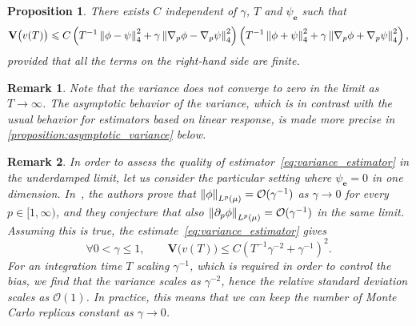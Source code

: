 \documentclass[11pt,a4paper]{article}
\newcommand{\var}[0]{\mathbf{V}}
\newcommand{\grad}{\nabla}
\newcommand{\vect}[1]{\boldsymbol{\mathbf #1}}
\theoremstyle{plain}
\newtheorem{proposition}{Proposition}[section]
\newtheorem{remark}{Remark}[section]
\numberwithin{equation}{section}
\renewcommand{\leq}{\leqslant}
\begin{document}
\begin{proposition}
    There exists $C$ independent of $\gamma$, $T$ and $\psi_{\vect e}$ such that
    \begin{equation}
        \label{eq:variance_estimator}
        \var \bigl(v(T)\bigr)
        \leq
        C \left( T^{-1} \norm{\phi - \psi}[4]^2  + \gamma \norm{\grad_p \phi - \grad_p \psi}[4]^2 \right)
        \left( T^{-1} \norm{\phi + \psi}[4]^2  + \gamma \norm{\grad_p \phi + \grad_p \psi}[4]^2 \right),
    \end{equation}
    provided that all the terms on the right-hand side are finite.
\end{proposition}
\begin{remark}
    Note that the variance does not converge to zero in the limit as $T \to \infty$.
    The asymptotic behavior of the variance,
    which is in contrast with the usual behavior for estimators based on linear response,
    is made more precise in \cref{proposition:asymptotic_variance} below.
\end{remark}
\begin{remark}
    In order to assess the quality of estimator~\eqref{eq:variance_estimator} in the underdamped limit,
    let us consider the particular setting where $\psi_{\vect e} = 0$ in one dimension.
    In~\cite[Remark 6.10]{MR2394704},
    the authors prove that $\norm{\phi}[\lp{p}{\mu}] = \mathcal O(\gamma^{-1})$ as $\gamma \to 0$ for every $p \in [1, \infty)$,
    and they conjecture that also $\norm{\partial_p \phi}[\lp{p}{\mu}] = \mathcal O(\gamma^{-1})$ in the same limit.
    Assuming this is true, the estimate~\eqref{eq:variance_estimator} gives
    \begin{equation}
        \label{eq:variance_scaling}
        \forall 0 < \gamma \leq 1, \qquad
        \var \bigl(v(T)\bigr)
        \leq C \left( T^{-1} \gamma^{-2} + \gamma^{-1} \right)^2.
    \end{equation}
    For an integration time $T$ scaling $\gamma^{-1}$,
    which is required in order to control the bias,
    we find that the variance scales as $\gamma^{-2}$,
    hence the relative standard deviation scales as $\mathcal O(1)$.
    In practice, this means that we can keep the number of Monte Carlo replicas constant as $\gamma \to 0$.
\end{remark}
\end{document}
